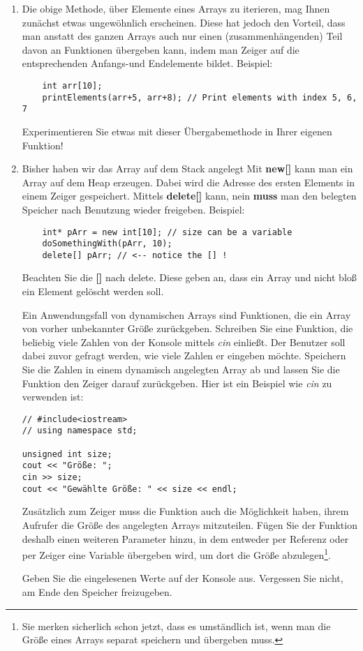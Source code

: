 \documentclass[
  accentcolor=tud1c,	%
  colorbacktitle,		%
  inverttitle,			%
  german,				%
  twoside
]{tudexercise}
\begin{document}
\begin{enumerate}
\item Die obige Methode, über Elemente eines Arrays zu iterieren, mag Ihnen zunächst etwas ungewöhnlich erscheinen.
Diese hat jedoch den Vorteil, dass man anstatt des ganzen Arrays auch nur einen (zusammenhängenden) Teil davon an Funktionen übergeben kann, indem man Zeiger auf die entsprechenden Anfangs-und Endelemente bildet.
Beispiel:
\begin{lstlisting}
	int arr[10];
	printElements(arr+5, arr+8); // Print elements with index 5, 6, 7
\end{lstlisting}
Experimentieren Sie etwas mit dieser Übergabemethode in Ihrer eigenen Funktion!

\item Bisher haben wir das Array auf dem Stack angelegt
Mit \textbf{new[]} kann man ein Array auf dem Heap erzeugen.
Dabei wird die Adresse des ersten Elements in einem Zeiger gespeichert.
Mittels \textbf{delete[]} kann, nein \textbf{muss} man den belegten Speicher nach Benutzung wieder freigeben.
Beispiel:
\begin{lstlisting}
	int* pArr = new int[10]; // size can be a variable
	doSomethingWith(pArr, 10);
	delete[] pArr; // <-- notice the [] !
\end{lstlisting}
Beachten Sie die \textbf{[]} nach delete. Diese geben an, dass ein Array und nicht bloß ein Element gelöscht werden soll.

Ein Anwendungsfall von dynamischen Arrays sind Funktionen, die ein Array von vorher unbekannter Größe zurückgeben. Schreiben Sie eine Funktion, die beliebig viele Zahlen von der Konsole mittels \emph{cin} einließt.
Der Benutzer soll dabei zuvor gefragt werden, wie viele Zahlen er eingeben möchte. Speichern Sie die Zahlen in einem dynamisch angelegten Array ab und lassen Sie die Funktion den Zeiger darauf zurückgeben.
Hier ist ein Beispiel wie \emph{cin} zu verwenden ist:
\begin{lstlisting}
// #include<iostream>
// using namespace std;

unsigned int size;
cout << "Größe: ";
cin >> size;
cout << "Gewählte Größe: " << size << endl;
\end{lstlisting}

Zusätzlich zum Zeiger muss die Funktion auch die Möglichkeit haben, ihrem Aufrufer die Größe des angelegten Arrays mitzuteilen. Fügen Sie der Funktion deshalb einen weiteren Parameter hinzu, in dem entweder per Referenz oder per Zeiger eine Variable übergeben wird, um dort die Größe abzulegen\footnote{Sie merken sicherlich schon jetzt, dass es umständlich ist, wenn man die Größe eines Arrays separat speichern und übergeben muss.}. 

Geben Sie die eingelesenen Werte auf der Konsole aus.
Vergessen Sie nicht, am Ende den Speicher freizugeben.
\end{enumerate}
\end{document}
